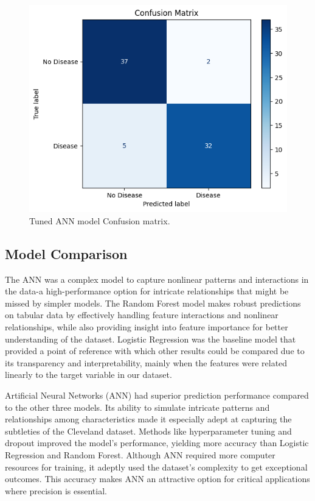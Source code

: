 \begin{figure}[htbp]
    \centerline{\includegraphics[scale=.65]{img/annconfusion.png}}
    \caption{Tuned ANN model Confusion matrix.}\label{annconfusion}
\end{figure}

\subsection{Model Comparison}
The ANN was a complex model to capture nonlinear patterns and interactions in the data-a high-performance option for intricate relationships that might be missed by simpler models. The Random Forest model makes robust predictions on tabular data by effectively handling feature interactions and nonlinear relationships, while also providing insight into feature importance for better understanding of the dataset. Logistic Regression was the baseline model that provided a point of reference with which other results could be compared due to its transparency and interpretability, mainly when the features were related linearly to the target variable in our dataset.

Artificial Neural Networks (ANN) had superior prediction performance compared to the other three models. Its ability to simulate intricate patterns and relationships among characteristics made it especially adept at capturing the subtleties of the Cleveland dataset. Methods like hyperparameter tuning and dropout improved the model's performance, yielding more accuracy than Logistic Regression and Random Forest. Although ANN required more computer resources for training, it adeptly used the dataset's complexity to get exceptional outcomes. This accuracy makes ANN an attractive option for critical applications where precision is essential.

